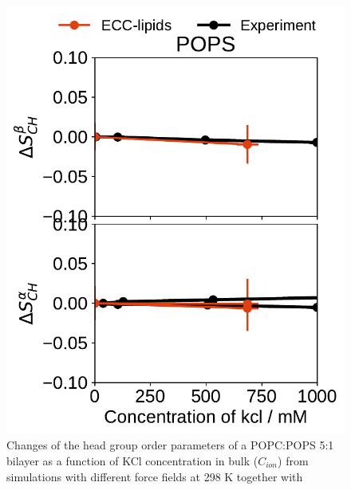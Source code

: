 \begin{figure}[htb!]
  \includegraphics[width=\figwidth]{../img/ecc_pops/order_parameters_changes_A-B_POPS_kcl.pdf} 
  \caption{\label{fig:delta_ordPar_KCl} 
    Changes of the head group order parameters of a POPC:POPS 5:1 bilayer as a function of KCl concentration 
    in bulk ($C_{ion}$) from simulations with different force fields at 298 K together with  
  } 
\end{figure} 
 
